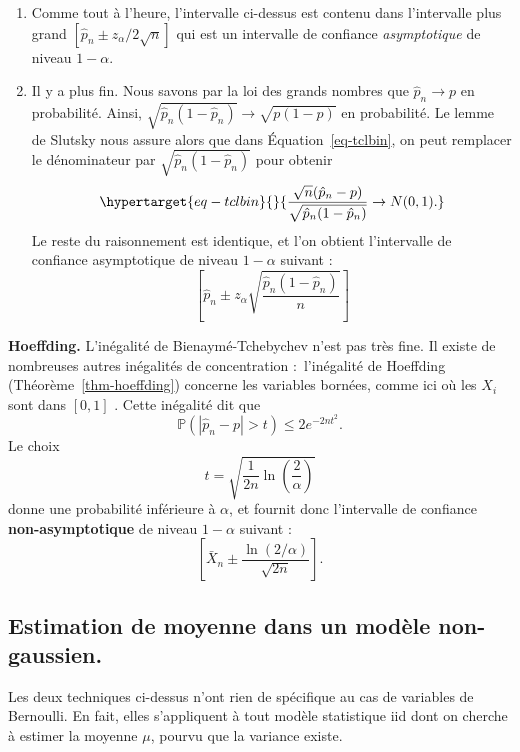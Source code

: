 \documentclass[
  10,
  letterpaper,
  DIV=11,
  numbers=noendperiod]{scrreport}
\providecommand{\tightlist}{%
  \setlength{\itemsep}{0pt}\setlength{\parskip}{0pt}}\usepackage{longtable,booktabs,array}
\theoremstyle{plain}
\theoremstyle{definition}
\theoremstyle{plain}
\theoremstyle{definition}
\theoremstyle{definition}
\theoremstyle{plain}
\theoremstyle{remark}
\begin{document}
\begin{enumerate}
\def\labelenumi{\arabic{enumi}.}
\tightlist
\item
  Comme tout à l'heure, l'intervalle ci-dessus est contenu dans
  l'intervalle plus grand \([\hat{p}_n \pm z_\alpha/2\sqrt{n}]\) qui est
  un intervalle de confiance \emph{asymptotique} de niveau \(1-\alpha\).
\item
  Il y a plus fin. Nous savons par la loi des grands nombres que
  \(\hat{p}_n \to p\) en probabilité. Ainsi,
  \(\sqrt{\hat{p}_n(1-\hat{p}_n)} \to \sqrt{p(1-p)}\) en probabilité. Le
  lemme de Slutsky nous assure alors que dans Équation~\ref{eq-tclbin},
  on peut remplacer le dénominateur par
  \(\sqrt{\hat{p}_n (1-\hat{p}_n)}\) pour obtenir
  \begin{equation}\protect\hypertarget{eq-tclbin}{}{ \frac{\sqrt{n}(\hat{p}_n - p)}{\sqrt{\hat{p}_n(1-\hat{p}_n)}} \to N(0,1).}\label{eq-tclbin}\end{equation}
  Le reste du raisonnement est identique, et l'on obtient l'intervalle
  de confiance asymptotique de niveau \(1-\alpha\) suivant :
  \[\left[\hat{p}_n \pm z_\alpha \sqrt{\frac{\hat{p}_n(1-\hat{p}_n)}{n}}\right] \]
\end{enumerate}

\textbf{Hoeffding.} L'inégalité de Bienaymé-Tchebychev n'est pas très
fine. Il existe de nombreuses autres inégalités de concentration
:~l'inégalité de Hoeffding (Théorème~\ref{thm-hoeffding}) concerne les
variables bornées, comme ici où les \(X_i\) sont dans \([0,1]\) . Cette
inégalité dit que
\[\mathbb{P}(|\hat{p}_n - p|>t)\leqslant 2 e^{-2nt^2}. \] Le choix
\[ t = \sqrt{\frac{1}{2n}\ln\left(\frac{2}{\alpha}\right)}\] donne une
probabilité inférieure à \(\alpha\), et fournit donc l'intervalle de
confiance \textbf{non-asymptotique} de niveau \(1-\alpha\) suivant :~
\[ \left[\bar{X}_n \pm \frac{\ln(2/\alpha)}{\sqrt{2n}}\right].\]

\hypertarget{estimation-de-moyenne-dans-un-moduxe8le-non-gaussien.}{%
\subsection{Estimation de moyenne dans un modèle
non-gaussien.}\label{estimation-de-moyenne-dans-un-moduxe8le-non-gaussien.}}

Les deux techniques ci-dessus n'ont rien de spécifique au cas de
variables de Bernoulli. En fait, elles s'appliquent à tout modèle
statistique iid dont on cherche à estimer la moyenne \(\mu\), pourvu que
la variance existe.
\end{document}
